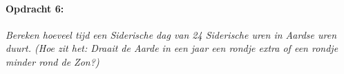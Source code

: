 \paragraph*{Opdracht 6:}

\emph{Bereken hoeveel tijd een Siderische dag van 24 Siderische uren
in Aardse uren duurt. (Hoe zit het: Draait de Aarde in een jaar een
rondje extra of een rondje minder rond de Zon?)}


